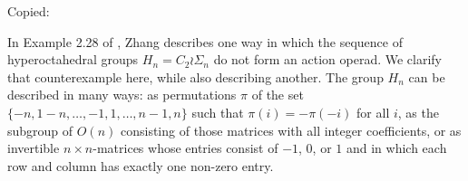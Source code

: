 \begin{example}\label{ex:counterex2}
Copied:

In Example 2.28 of \cite{zhang-grp}, Zhang describes one way in which the sequence of hyperoctahedral groups $H_n = C_2 \wr \Sigma_n$ do not form an action operad. We clarify that counterexample here, while also describing another.
The group $H_n$ can be described in many ways: as permutations $\pi$ of the set $\{-n, 1-n, \ldots, -1, 1, \ldots, n-1, n\}$ such that $\pi(i) = -\pi(-i)$ for all $i$, as the subgroup of $O(n)$ consisting of those matrices with all integer coefficients, or as invertible $n \times n$-matrices whose entries consist of $-1$, $0$, or $1$ and in which each row and column has exactly one non-zero entry. 


\end{example}
